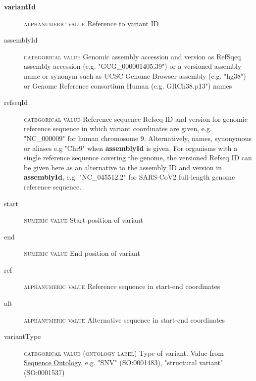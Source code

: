 \documentclass[a4paper, 10pt]{article}        %
\begin{document}
\begin{description}
	\item[\textbf{variantId}] {\textsc{alphanumeric value}} Reference to variant ID
	\item[assemblyId] {\textsc{categorical value}} Genomic assembly accession and version as RefSqeq assembly accession (e.g. "GCG\_000001405.39") or a versioned assembly name or synonym such as UCSC Genome Browser assembly (e.g. "hg38") or Genome Reference consortium Human (e.g. GRCh38.p13") names
 	\item[refseqId] {\textsc{categorical value}} Reference sequence Refseq ID and version for genomic reference sequence in which variant coordinates are given, e.g. "NC\_000009" for human chromosome 9. Alternatively, names, synonymous or aliases e.g "Chr9" when \textbf{assemblyId} is given. For organisms with a single reference sequence covering the genome, the versioned Refseq ID can be given here as an alternative to the assembly ID and version in \textbf{assemblyId}, e.g. "NC\_045512.2" for SARS-CoV2 full-length genome reference sequence. 
	\item[start] {\textsc{numeric value}} Start position of variant
	\item[end] {\textsc{numeric value}} End position of variant %
	\item[ref] {\textsc{alphanumeric value}} Reference sequence in start-end coordinates
	\item[alt] {\textsc{alphanumeric value}} Alternative sequence in start-end coordinates
	\item[variantType] {\textsc{categorical value (ontology label)}} Type of variant. Value from \href{http://www.sequenceontology.org}{Sequence Ontology}, e.g. "SNV" (SO:0001483), "structural variant"  (SO:0001537)
 \end{description}
 
\end{document}
